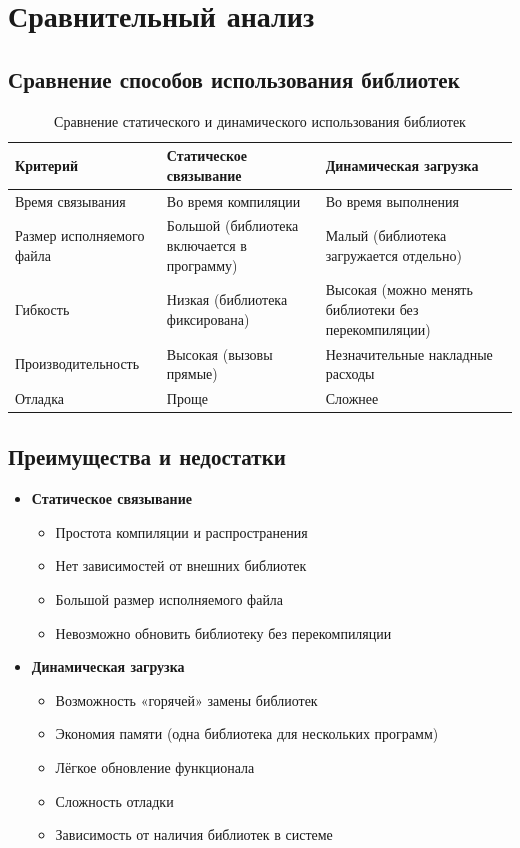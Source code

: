 \section{Сравнительный анализ}

\subsection{Сравнение способов использования библиотек}

\begin{table}[H]
\centering
\begin{tabular}{|p{}|p{}|p{}|}
\hline
\textbf{Критерий} & \textbf{Статическое связывание} & \textbf{Динамическая загрузка} \\ \hline
Время связывания & Во время компиляции & Во время выполнения \\ \hline
Размер исполняемого файла & Большой (библиотека включается в программу) & Малый (библиотека загружается отдельно) \\ \hline
Гибкость & Низкая (библиотека фиксирована) & Высокая (можно менять библиотеки без перекомпиляции) \\ \hline
Производительность & Высокая (вызовы прямые) & Незначительные накладные расходы \\ \hline
Отладка & Проще & Сложнее \\ \hline
\end{tabular}
\caption{Сравнение статического и динамического использования библиотек}
\end{table}

\subsection{Преимущества и недостатки}

\begin{itemize}
    \item \textbf{Статическое связывание}
    \begin{itemize}
        \item[+] Простота компиляции и распространения
        \item[+] Нет зависимостей от внешних библиотек
        \item[-] Большой размер исполняемого файла
        \item[-] Невозможно обновить библиотеку без перекомпиляции
    \end{itemize}
    
    \item \textbf{Динамическая загрузка}
    \begin{itemize}
        \item[+] Возможность «горячей» замены библиотек
        \item[+] Экономия памяти (одна библиотека для нескольких программ)
        \item[+] Лёгкое обновление функционала
        \item[-] Сложность отладки
        \item[-] Зависимость от наличия библиотек в системе
    \end{itemize}
\end{itemize}